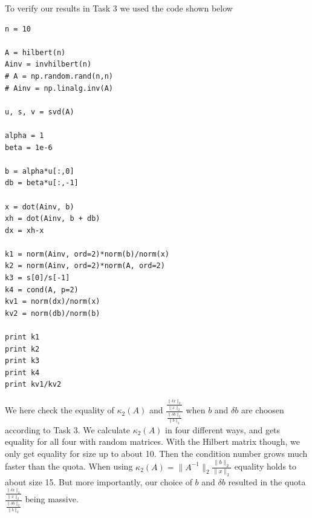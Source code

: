 \message{ !name(assignment4.tex)}\documentclass[a4paper]{article}
\begin{document}
\begin{enumerate}
To verify our results in Task 3 we used the code shown below
\begin{lstlisting}
n = 10

A = hilbert(n)
Ainv = invhilbert(n)
# A = np.random.rand(n,n)
# Ainv = np.linalg.inv(A)

u, s, v = svd(A)

alpha = 1
beta = 1e-6

b = alpha*u[:,0]
db = beta*u[:,-1]

x = dot(Ainv, b)
xh = dot(Ainv, b + db)
dx = xh-x

k1 = norm(Ainv, ord=2)*norm(b)/norm(x)
k2 = norm(Ainv, ord=2)*norm(A, ord=2)
k3 = s[0]/s[-1]
k4 = cond(A, p=2)
kv1 = norm(dx)/norm(x)
kv2 = norm(db)/norm(b)

print k1
print k2
print k3
print k4
print kv1/kv2
\end{lstlisting}
We here check the equality of $\kappa_2(A)$ and $\frac{\frac{\|\delta x\|_2}{\|x\|_2}}{\frac{\|\delta b\|_2}{\|b\|_2}}$ when $b$ and $\delta b$ are choosen according to Task 3. We calculate $\kappa_2(A)$ in four different ways, and gets equality for all four with random matrices. With the Hilbert matrix though, we only get equality for size up to about 10. Then the condition number grows much faster than the quota. When using $\kappa_2(A) = \|A^{-1}\|_2\frac{\|b\|_2}{\|x\|_2}$ equality holds to about size 15. But more importantly, our choice of $b$ and $\delta b$ resulted in the quota $\frac{\frac{\|\delta x\|_2}{\|x\|_2}}{\frac{\|\delta b\|_2}{\|b\|_2}}$ being massive. 

\end{enumerate}
\end{document}

